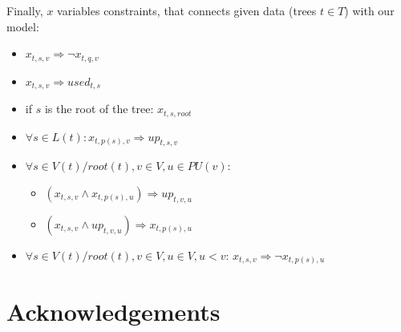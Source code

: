 \documentclass[runningheads, envcountsame, a4paper]{llncs}
\begin{document}
Finally, $x$ variables constraints, that connects given data (trees $t \in T$) with our model:
\begin{itemize}
\item $x_{t,s,v} \Rightarrow \neg x_{t,q,v}$
\item $x_{t,s,v} \Rightarrow used_{t,s}$
\item if $s$ is the root of the tree: $x_{t,s,root}$
\item $\forall s \in L(t): x_{t,p(s),v} \Rightarrow up_{t,s,v}$
\item $\forall s \in V(t) / root(t), v \in V, u \in PU(v)$:
    \begin{itemize}
    \item $(x_{t,s,v} \wedge x_{t,p(s),u}) \Rightarrow up_{t,v,u}$
    \item $(x_{t,s,v} \wedge up_{t,v,u}) \Rightarrow x_{t,p(s),u}$
    \end{itemize}
\item $\forall s \in V(t) / root(t), v \in V, u \in V, u < v$: 
    $x_{t,s,v} \Rightarrow \neg x_{t,p(s),u}$
    

\end{itemize}



\section*{Acknowledgements}




\clearpage
\end{document}
